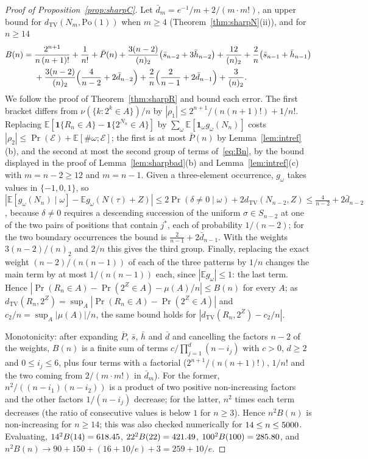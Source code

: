 \documentclass[11pt,a4paper]{article}
\theoremstyle{plain}
\theoremstyle{definition}
\theoremstyle{remark}
\begin{document}
\begin{proof}[Proof of Proposition~\ref{prop:sharpC}]
Let $\bar d_m=e^{-1}/m+2/(m\cdot m!)$, an upper bound for $d_{\mathrm{TV}}(N_m,\mathrm{Po}(1))$ when $m\ge4$ (Theorem~\ref{thm:sharpN}(ii)), and for $n\ge14$
\begin{equation}\label{eq:Bn}
\begin{aligned}
B(n)={}&\frac{2^{n+1}}{n\,(n+1)!}+\frac1{n!}+\bar P(n)
+\frac{3(n-2)}{(n)_2}\bigl(\bar s_{n-2}+3\bar h_{n-2}\bigr)+\frac{12}{(n)_2}+\frac2n\bigl(\bar s_{n-1}+\bar h_{n-1}\bigr)\\
&+\frac{3(n-2)}{(n)_2}\Bigl(\frac4{n-2}+2\bar d_{n-2}\Bigr)+\frac2n\Bigl(\frac2{n-1}+2\bar d_{n-1}\Bigr)+\frac3{(n)_2}.
\end{aligned}
\end{equation}
We follow the proof of Theorem~\ref{thm:sharpR} and bound each error. The first bracket differs from $\nu(\{k:2^k\in A\})/n$ by $|\rho_1|\le2^{n+1}/(n(n+1)!)+1/n!$. Replacing $\mathbb E[\mathbf 1\{R_n\in A\}-\mathbf 1\{2^{N_n}\in A\}]$ by $\sum_\omega\mathbb E[\mathbf 1_\omega g_\omega(N_n)]$ costs $|\rho_2|\le\Pr(\mathcal E)+\mathbb E[\#\omega;\mathcal E]$; the first is at most $\bar P(n)$ by Lemma~\ref{lem:intref}(b), and the second at most the second group of terms of~\eqref{eq:Bn}, by the bound displayed in the proof of Lemma~\ref{lem:sharpbad}(b) and Lemma~\ref{lem:intref}(c) with $m=n-2\ge12$ and $m=n-1$. Given a three-element occurrence, $g_\omega$ takes values in $\{-1,0,1\}$, so $|\mathbb E[g_\omega(N_n)\mid\omega]-\mathbb Eg_\omega(N(\tau)+Z)|\le2\Pr(\delta\ne0\mid\omega)+2d_{\mathrm{TV}}(N_{n-2},Z)\le\frac4{n-2}+2\bar d_{n-2}$, because $\delta\ne0$ requires a descending succession of the uniform $\sigma\in S_{n-2}$ at one of the two pairs of positions that contain $j^*$, each of probability $1/(n-2)$; for the two boundary occurrences the bound is $\frac2{n-1}+2\bar d_{n-1}$. With the weights $3(n-2)/(n)_2$ and $2/n$ this gives the third group. Finally, replacing the exact weight $(n-2)/(n(n-1))$ of each of the three patterns by $1/n$ changes the main term by at most $1/(n(n-1))$ each, since $|\mathbb Eg_\omega|\le1$: the last term. Hence $|\Pr(R_n\in A)-\Pr(2^Z\in A)-\mu(A)/n|\le B(n)$ for every $A$; as $d_{\mathrm{TV}}(R_n,2^Z)=\sup_A|\Pr(R_n\in A)-\Pr(2^Z\in A)|$ and $c_2/n=\sup_A|\mu(A)|/n$, the same bound holds for $|d_{\mathrm{TV}}(R_n,2^Z)-c_2/n|$.

Monotonicity: after expanding $\bar P$, $\bar s$, $\bar h$ and $\bar d$ and cancelling the factors $n-2$ of the weights, $B(n)$ is a finite sum of terms $c/\prod_{j=1}^{d}(n-i_j)$ with $c>0$, $d\ge2$ and $0\le i_j\le6$, plus four terms with a factorial ($2^{n+1}/(n(n+1)!)$, $1/n!$ and the two coming from $2/(m\cdot m!)$ in $\bar d_m$). For the former, $n^2/((n-i_1)(n-i_2))$ is a product of two positive non-increasing factors and the other factors $1/(n-i_j)$ decrease; for the latter, $n^2$ times each term decreases (the ratio of consecutive values is below $1$ for $n\ge3$). Hence $n^2B(n)$ is non-increasing for $n\ge14$; this was also checked numerically for $14\le n\le5000$. Evaluating, $14^2B(14)=618.45$, $22^2B(22)=421.49$, $100^2B(100)=285.80$, and $n^2B(n)\to90+150+(16+10/e)+3=259+10/e$.
\end{proof}
\end{document}
